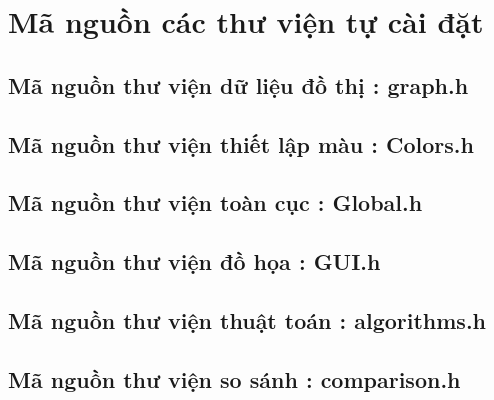 \documentclass[14pt,a4paper]{report}
\begin{document}
\section{Mã nguồn các thư viện tự cài đặt}

\subsection{Mã nguồn thư viện dữ liệu đồ thị : graph.h}


\subsection{Mã nguồn thư viện thiết lập màu : Colors.h}


\subsection{Mã nguồn thư viện toàn cục : Global.h}


\subsection{Mã nguồn thư viện đồ họa : GUI.h}


\subsection{Mã nguồn thư viện thuật toán : algorithms.h}


\subsection{Mã nguồn thư viện so sánh : comparison.h}

\end{document}
